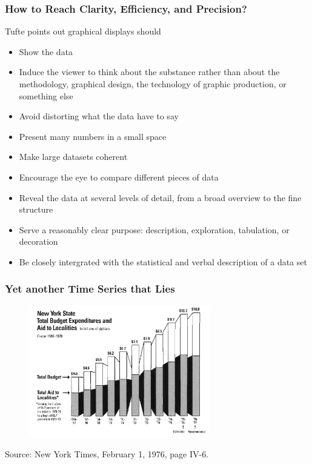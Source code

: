 \documentclass[notes, aspectratio=1610]{beamer}
\begin{document}
\begin{frame}
	\frametitle{How to Reach Clarity, Efficiency, and Precision?}
	Tufte points out graphical displays should
	\begin{itemize}
		\item 
		Show the data
		\item 
		Induce the viewer to think about the substance rather than
		about the methodology, graphical design, the technology of 
		graphic production, or something else 
		\item 
		Avoid distorting what the data have to say 
		\item
		Present many numbers in a small space 
		\item 
		Make large datasets coherent
		\item
		Encourage the eye to compare different pieces of data 
		\item 
		Reveal the data at several levels of detail, from a broad 
		overview to the fine structure 
		\item 
		Serve a reasonably clear purpose: description, 
		exploration, tabulation, or decoration 
		\item 
		Be closely intergrated with the statistical and verbal 
		description of a data set 
	\end{itemize}
\end{frame}

\begin{frame}
	\frametitle{Yet another Time Series that Lies}
	\begin{figure}
		\begin{small}
			\begin{center}
				\includegraphics[width=0.7\textwidth]{
					images/nys_budget.png
					}
			\end{center}
		\end{small}
	\end{figure}

	\footnotesize
	Source: New York Times, February 1, 1976, page IV-6.
\end{frame}
\end{document}
